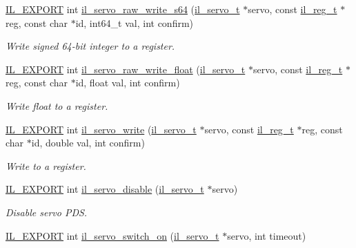 \begin{DoxyCompactItemize}
\hyperlink{common_8h_a6bb629d26c52bfe10519ba3176853f47}{I\+L\+\_\+\+E\+X\+P\+O\+RT} int \hyperlink{group__IL__SERVO_ga4ac4489c10367847a0d62d53ebf25a60}{il\+\_\+servo\+\_\+raw\+\_\+write\+\_\+s64} (\hyperlink{group__IL__SERVO_ga3369ddfcc33492fe3a28f96cf455b13e}{il\+\_\+servo\+\_\+t} $\ast$servo, const \hyperlink{structil__reg__t}{il\+\_\+reg\+\_\+t} $\ast$reg, const char $\ast$id, int64\+\_\+t val, int confirm)
\begin{DoxyCompactList}\small\item\em Write signed 64-\/bit integer to a register. \end{DoxyCompactList}\item 
\hyperlink{common_8h_a6bb629d26c52bfe10519ba3176853f47}{I\+L\+\_\+\+E\+X\+P\+O\+RT} int \hyperlink{group__IL__SERVO_ga56da0b13de04887cc5a6f9b2d4e7497e}{il\+\_\+servo\+\_\+raw\+\_\+write\+\_\+float} (\hyperlink{group__IL__SERVO_ga3369ddfcc33492fe3a28f96cf455b13e}{il\+\_\+servo\+\_\+t} $\ast$servo, const \hyperlink{structil__reg__t}{il\+\_\+reg\+\_\+t} $\ast$reg, const char $\ast$id, float val, int confirm)
\begin{DoxyCompactList}\small\item\em Write float to a register. \end{DoxyCompactList}\item 
\hyperlink{common_8h_a6bb629d26c52bfe10519ba3176853f47}{I\+L\+\_\+\+E\+X\+P\+O\+RT} int \hyperlink{group__IL__SERVO_gad1474e21342f4f02e6435d3f6d66dec1}{il\+\_\+servo\+\_\+write} (\hyperlink{group__IL__SERVO_ga3369ddfcc33492fe3a28f96cf455b13e}{il\+\_\+servo\+\_\+t} $\ast$servo, const \hyperlink{structil__reg__t}{il\+\_\+reg\+\_\+t} $\ast$reg, const char $\ast$id, double val, int confirm)
\begin{DoxyCompactList}\small\item\em Write to a register. \end{DoxyCompactList}\item 
\hyperlink{common_8h_a6bb629d26c52bfe10519ba3176853f47}{I\+L\+\_\+\+E\+X\+P\+O\+RT} int \hyperlink{group__IL__SERVO_ga8b5938454ac8183a514d11203f2e6197}{il\+\_\+servo\+\_\+disable} (\hyperlink{group__IL__SERVO_ga3369ddfcc33492fe3a28f96cf455b13e}{il\+\_\+servo\+\_\+t} $\ast$servo)
\begin{DoxyCompactList}\small\item\em Disable servo P\+DS. \end{DoxyCompactList}\item 
\hyperlink{common_8h_a6bb629d26c52bfe10519ba3176853f47}{I\+L\+\_\+\+E\+X\+P\+O\+RT} int \hyperlink{group__IL__SERVO_ga9ad6a595ca932caf31c2500de1e8a812}{il\+\_\+servo\+\_\+switch\+\_\+on} (\hyperlink{group__IL__SERVO_ga3369ddfcc33492fe3a28f96cf455b13e}{il\+\_\+servo\+\_\+t} $\ast$servo, int timeout)

\end{DoxyCompactItemize}
